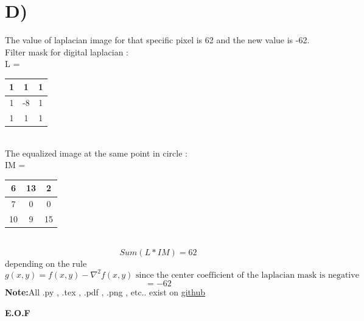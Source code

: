 \documentclass{article}
\begin{document}
\section*{D)}
The value of laplacian image for that specific pixel is  62 and the new value is -62.\\
Filter mask for digital laplacian : \\
L = 
\begin{tabular}{|c|c|c|}
\hline
1&1&1 \\ \hline
1&-8&1 \\ \hline
1& 1&1 \\ \hline
\end{tabular} \\
The equalized image at the same point in circle : \\
IM = 
\begin{tabular}{|c|c|c|}
\hline
6&13&2 \\ \hline
7&0&0 \\ \hline
10&9&15 \\ \hline
\end{tabular} \\
\[Sum(L*IM) = 62\]
depending on the rule 
\[g(x,y)  = f(x,y)-\nabla^2 f(x,y) \text{ since the center coefficient of the laplacian mask is negative } \]
\[= -62\]
\textbf{Note:}All .py , .tex , .pdf , .png , etc.. exist on \href{https://github.com/aqeel13932/IP/tree/master/hw8}{github}
\begin{center}

\textbf{E.O.F}
\end{center}
\end{document}
